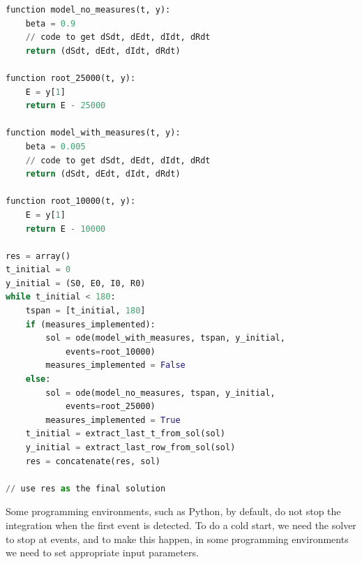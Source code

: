 \begin{minipage}{\linewidth}
\centering
\begin{lstlisting}[language=Python]
function model_no_measures(t, y):
    beta = 0.9
    // code to get dSdt, dEdt, dIdt, dRdt
    return (dSdt, dEdt, dIdt, dRdt)

function root_25000(t, y):
    E = y[1]
    return E - 25000

function model_with_measures(t, y):
    beta = 0.005
    // code to get dSdt, dEdt, dIdt, dRdt
    return (dSdt, dEdt, dIdt, dRdt)

function root_10000(t, y):
    E = y[1]
    return E - 10000

res = array()
t_initial = 0
y_initial = (S0, E0, I0, R0)
while t_initial < 180:
    tspan = [t_initial, 180]
    if (measures_implemented):
        sol = ode(model_with_measures, tspan, y_initial,
            events=root_10000)
        measures_implemented = False
    else:
        sol = ode(model_no_measures, tspan, y_initial,
            events=root_25000)
        measures_implemented = True
    t_initial = extract_last_t_from_sol(sol)
    y_initial = extract_last_row_from_sol(sol)
    res = concatenate(res, sol)

// use res as the final solution
\end{lstlisting}
\end{minipage}

Some programming environments, such as Python, by default, do not stop the integration when the first event is detected. To do a cold start, we need the solver to stop at events, and to make this happen, in some programming environments we need to set appropriate input parameters. 

